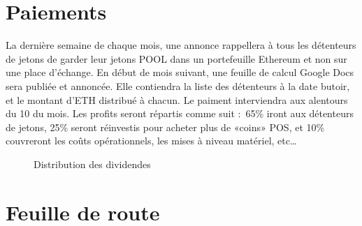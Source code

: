 \newpage

\section{Paiements}
La dernière semaine de chaque mois, une annonce rappellera à tous les détenteurs de jetons de garder leur jetons POOL dans un portefeuille Ethereum et non sur une place d'échange. En début de mois suivant, une feuille de calcul Google Docs sera publiée et annoncée. Elle contiendra la liste des détenteurs à la date butoir, et le montant d'ETH distribué à chacun. Le paiment interviendra aux alentours du 10 du mois. Les profits seront répartis comme suit : 65\% iront aux détenteurs de jetons, 25\% seront réinvestis pour acheter plus de «coins» POS, et 10\% couvreront les coûts opérationnels, les mises à niveau matériel, etc…

\begin{figure}[h]
\centering
\caption{Distribution des dividendes}
\end{figure}

\section{Feuille de route}

